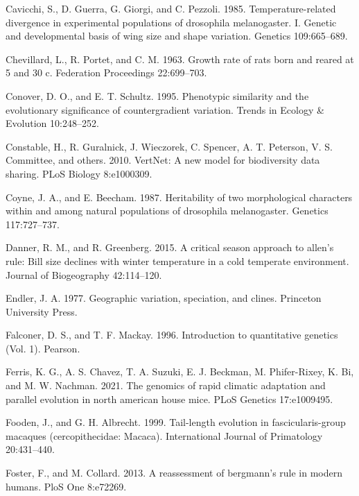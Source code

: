 \documentclass[]{article}
\begin{document}
\leavevmode\hypertarget{ref-Cavicchi1985}{}%
Cavicchi, S., D. Guerra, G. Giorgi, and C. Pezzoli. 1985.
Temperature-related divergence in experimental populations of drosophila
melanogaster. I. Genetic and developmental basis of wing size and shape
variation. Genetics 109:665--689.

\leavevmode\hypertarget{ref-Chevillard1963}{}%
Chevillard, L., R. Portet, and C. M. 1963. Growth rate of rats born and
reared at 5 and 30 c. Federation Proceedings 22:699--703.

\leavevmode\hypertarget{ref-Conover1995}{}%
Conover, D. O., and E. T. Schultz. 1995. Phenotypic similarity and the
evolutionary significance of countergradient variation. Trends in
Ecology \& Evolution 10:248--252.

\leavevmode\hypertarget{ref-Constable2010}{}%
Constable, H., R. Guralnick, J. Wieczorek, C. Spencer, A. T. Peterson,
V. S. Committee, and others. 2010. VertNet: A new model for biodiversity
data sharing. PLoS Biology 8:e1000309.

\leavevmode\hypertarget{ref-Coyne1987}{}%
Coyne, J. A., and E. Beecham. 1987. Heritability of two morphological
characters within and among natural populations of drosophila
melanogaster. Genetics 117:727--737.

\leavevmode\hypertarget{ref-Danner2015}{}%
Danner, R. M., and R. Greenberg. 2015. A critical season approach to
allen's rule: Bill size declines with winter temperature in a cold
temperate environment. Journal of Biogeography 42:114--120.

\leavevmode\hypertarget{ref-Endler1977}{}%
Endler, J. A. 1977. Geographic variation, speciation, and clines.
Princeton University Press.

\leavevmode\hypertarget{ref-Falconer1996}{}%
Falconer, D. S., and T. F. Mackay. 1996. Introduction to quantitative
genetics (Vol. 1). Pearson.

\leavevmode\hypertarget{ref-Ferris2021}{}%
Ferris, K. G., A. S. Chavez, T. A. Suzuki, E. J. Beckman, M.
Phifer-Rixey, K. Bi, and M. W. Nachman. 2021. The genomics of rapid
climatic adaptation and parallel evolution in north american house mice.
PLoS Genetics 17:e1009495.

\leavevmode\hypertarget{ref-Fooden1999}{}%
Fooden, J., and G. H. Albrecht. 1999. Tail-length evolution in
fascicularis-group macaques (cercopithecidae: Macaca). International
Journal of Primatology 20:431--440.

\leavevmode\hypertarget{ref-Foster2013}{}%
Foster, F., and M. Collard. 2013. A reassessment of bergmann's rule in
modern humans. PloS One 8:e72269.
\end{document}
